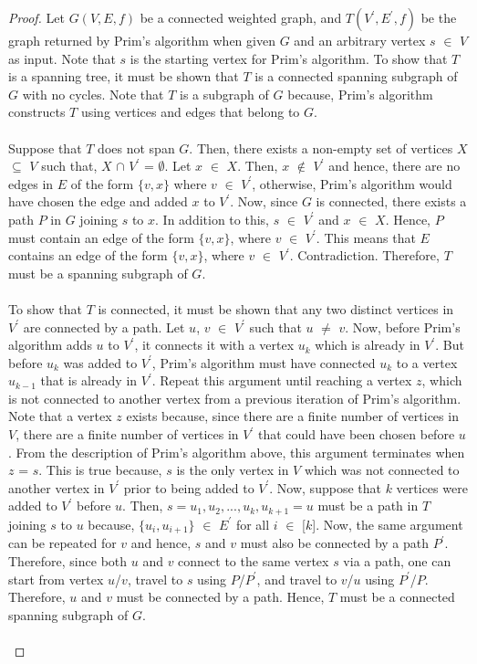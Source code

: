 \documentclass[12pt]{article}
\numberwithin{equation}{subsection}
\numberwithin{table}{subsection}
\numberwithin{algorithm}{subsection}
\numberwithin{figure}{subsection}
\begin{document}
\begin{proof}
Let $G(V,E,f)$ be a connected weighted graph, and $T(V^\prime,E^\prime,f)$ be the graph returned by Prim's algorithm when given $G$ and an arbitrary vertex $s$ $\in$ $V$ as input. Note that $s$ is the starting vertex for Prim's algorithm. To show that $T$ is a spanning tree, it must be shown that $T$ is a connected spanning subgraph of $G$ with no cycles. Note that $T$ is a subgraph of $G$ because, Prim's algorithm constructs $T$ using vertices and edges that belong to $G$.\\\\
Suppose that $T$ does not span $G$. Then, there exists a non-empty set of vertices $X$ $\subseteq$ $V$ such that, $X$ $\cap$ $V^\prime$ = $\emptyset$. Let $x$ $\in$ $X$. Then, $x$ $\notin$ $V^\prime$ and hence, there are no edges in $E$ of the form $\{v,x\}$ where $v$ $\in$ $V^\prime$, otherwise, Prim's algorithm would have chosen the edge and added $x$ to $V^\prime$. Now, since $G$ is connected, there exists a path $P$ in $G$ joining $s$ to $x$. In addition to this, $s$ $\in$ $V^\prime$ and $x$ $\in$ $X$. Hence, $P$ must contain an edge of the form $\{v, x\}$, where $v$ $\in$ $V^\prime$. This means that $E$ contains an edge of the form $\{v, x\}$, where $v$ $\in$ $V^\prime$. Contradiction. Therefore, $T$ must be a spanning subgraph of $G$.\\\\
To show that $T$ is connected, it must be shown that any two distinct vertices in $V^\prime$ are connected by a path. Let $u$, $v$ $\in$ $V^\prime$ such that $u$ $\neq$ $v$. Now, before Prim's algorithm adds $u$ to $V^\prime$, it connects it with a vertex $u_k$ which is already in $V^\prime$. But before $u_k$ was added to $V^\prime$, Prim's algorithm must have connected $u_k$ to a vertex $u_{k-1}$ that is already in $V^\prime$. Repeat this argument until reaching a vertex $z$, which is not connected to another vertex from a previous iteration of Prim's algorithm. Note that a vertex $z$ exists because, since there are a finite number of vertices in $V$, there are a finite number of vertices in $V^\prime$ that could have been chosen before $u$. From the description of Prim's algorithm above, this argument terminates when $z$ = $s$. This is true because, $s$ is the only vertex in $V$ which was not connected to another vertex in $V^\prime$ prior to being added to $V^\prime$. Now, suppose that $k$ vertices were added to $V^\prime$ before $u$. Then, $s= u_1, u_2, ..., u_k, u_{k+1} = u$ must be a path in $T$ joining $s$ to $u$ because, $\{u_i, u_{i+1}\}$ $\in$ $E^\prime$ for all $i$ $\in$ [$k$]. Now, the same argument can be repeated for $v$ and hence, $s$ and $v$ must also be connected by a path $P^\prime$. Therefore, since both $u$ and $v$ connect to the same vertex $s$ via a path, one can start from vertex $u$/$v$, travel to $s$ using $P$/$P^\prime$, and travel to $v$/$u$ using $P^\prime$/$P$. Therefore, $u$ and $v$ must be connected by a path. Hence, $T$ must be a connected spanning subgraph of $G$.\\\\

\end{proof}
\end{document}
